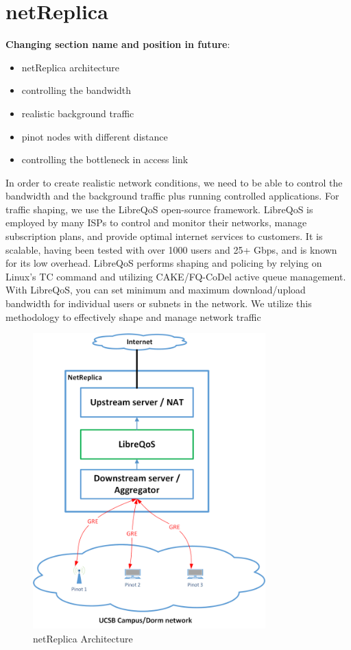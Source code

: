 \section{netReplica}

\textbf{Changing section name and position in future}: 
\begin{itemize}
    \item netReplica architecture
    \item controlling the bandwidth  
    \item realistic background traffic 
    \item pinot nodes with different distance  
    \item controlling the bottleneck in access link
\end{itemize}



In order to create realistic network conditions, we need to be able to control the bandwidth and the background traffic plus running controlled applications. 
For traffic shaping, we use the LibreQoS open-source framework. LibreQoS is employed by many ISPs to control and monitor their networks, manage subscription plans, 
and provide optimal internet services to customers. It is scalable, having been tested with over 1000 users and 25+ Gbps, and is known for its low overhead. 
LibreQoS performs shaping and policing by relying on Linux's TC command and utilizing CAKE/FQ-CoDel active queue management. With LibreQoS, you can set minimum 
and maximum download/upload bandwidth for individual users or subnets in the network. We utilize this methodology to effectively shape and manage network traffic

\begin{figure}[H]
    \centering
    \includegraphics[width=0.8\textwidth]{figures/netReplica.png}
    \caption{netReplica Architecture}
    \label{fig:netReplica}
\end{figure}



